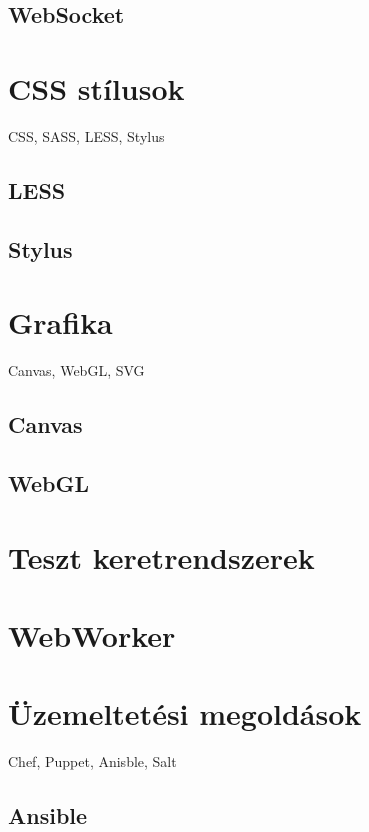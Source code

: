 \subsection{WebSocket}

\section{CSS stílusok}

CSS, SASS, LESS, Stylus

\subsection{LESS}

\subsection{Stylus}

\section{Grafika}

Canvas, WebGL, SVG

\subsection{Canvas}

\subsection{WebGL}

\section{Teszt keretrendszerek}

\section{WebWorker}

\section{Üzemeltetési megoldások}

Chef, Puppet, Anisble, Salt

\subsection{Ansible}
